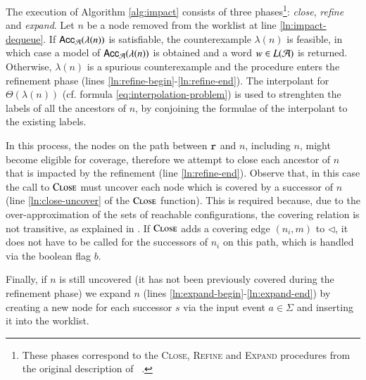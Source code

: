 \documentclass[10pt,conference,letterpaper,twocolumn]{IEEEtran}
\begin{document}
The execution of Algorithm \ref{alg:impact} consists of three
phases\footnote{These phases correspond to the \textsc{Close},
  \textsc{Refine} and \textsc{Expand} procedures from the original
  description of \impact~\cite{mcmillan06}.}: \emph{close},
\emph{refine} and \emph{expand}. Let $n$ be a node removed from the
worklist at line \ref{ln:impact-dequeue}. If $\mathsf{Acc}_{\mathcal{A}}(\lambda(n))$
is satisfiable, the counterexample $\lambda(n)$ is feasible, in which
case a model of $\mathsf{Acc}_{\mathcal{A}}(\lambda(n))$ is obtained and a word $w
\in L(\mathcal{A})$ is returned. Otherwise, $\lambda(n)$ is a spurious
counterexample and the procedure enters the refinement phase (lines
\ref{ln:refine-begin}-\ref{ln:refine-end}). The interpolant for
$\Theta(\lambda(n))$ (cf. formula \ref{eq:interpolation-problem}) is
used to strenghten the labels of all the ancestors of $n$, by
conjoining the formulae of the interpolant to the existing labels.

In this process, the nodes on the path between $\mathtt{r}$ and $n$,
including $n$, might become eligible for coverage, therefore we
attempt to close each ancestor of $n$ that is impacted by the
refinement (line \ref{ln:refine-end}). Observe that, in this case the
call to $\Call{Close}{}$ must uncover each node which is covered by a
successor of $n$ (line \ref{ln:close-uncover} of the $\Call{Close}{}$
function). This is required because, due to the over-approximation of
the sets of reachable configurations, the covering relation is not
transitive, as explained in \cite{mcmillan06}. If $\Call{Close}{}$
adds a covering edge $(n_i,m)$ to $\lhd$, it does not have to be
called for the successors of $n_i$ on this path, which is handled via
the boolean flag $b$.

Finally, if $n$ is still uncovered (it has not been previously covered
during the refinement phase) we expand $n$ (lines
\ref{ln:expand-begin}-\ref{ln:expand-end}) by creating a new node for
each successor $s$ via the input event $a \in \Sigma$ and inserting it
into the worklist.
\end{document}

